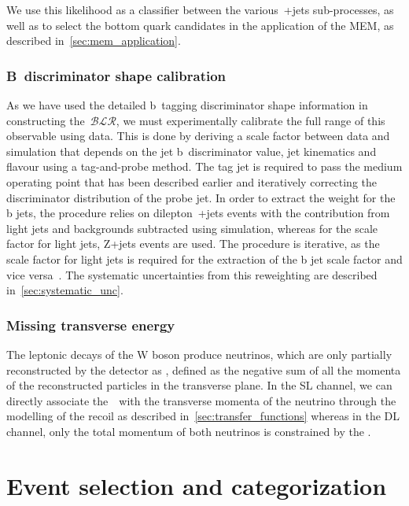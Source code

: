 We use this likelihood as a classifier between the various~\ttbar+jets sub-processes, as well as to select the bottom quark candidates in the application of the MEM, as described in~\cref{sec:mem_application}. 

\subsubsection{B~discriminator shape calibration}
As we have used the detailed b~tagging discriminator shape information in constructing the~$\mathcal{BLR}$, we must experimentally calibrate the full range of this observable using data. This is done by deriving a scale factor between data and simulation that depends on the jet b~discriminator value, jet kinematics and flavour using a tag-and-probe method. The tag jet is required to pass the medium operating point that has been described earlier and iteratively correcting the discriminator distribution of the probe jet. In order to extract the weight for the b jets, the procedure relies on dilepton~\ttbar+jets events with the contribution from light jets and backgrounds subtracted using simulation, whereas for the scale factor for light jets, Z+jets events are used. The procedure is iterative, as the scale factor for light jets is required for the extraction of the b jet scale factor and vice versa~\cite{CMS:2013sea,CMS-PAS-BTV-15-001}. The systematic uncertainties from this reweighting are described in~\cref{sec:systematic_unc}.

\subsubsection{Missing transverse energy}
The leptonic decays of the W boson produce neutrinos, which are only partially reconstructed by the detector as \MET, defined as the negative sum of all the momenta of the reconstructed particles in the transverse plane. In the SL channel, we can directly associate the~\MET~with the transverse momenta of the neutrino through the modelling of the recoil as described in~\cref{sec:transfer_functions} whereas in the DL channel, only the total momentum of both neutrinos is constrained by the \MET.

\section{Event selection and categorization}
\label{sec:event_selection}

